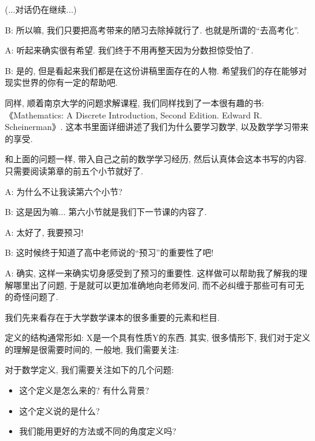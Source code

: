 


\begin{dialogue}
\begin{center}
(...对话仍在继续...)	
\end{center}
	B: 所以嘛, 我们只要把高考带来的陋习去除掉就行了. 也就是所谓的``去高考化''.
	
	A: 听起来确实很有希望. 我们终于不用再整天因为分数担惊受怕了.
	
	B: 是的, 但是看起来我们都是在这份讲稿里面存在的人物. 希望我们的存在能够对现实世界的你有一定的帮助吧. 
\end{dialogue}

同样, 顺着南京大学的问题求解课程, 我们同样找到了一本很有趣的书: 《Mathematics: A Discrete Introduction, Second Edition. Edward R. Scheinerman》. 这本书里面详细讲述了我们为什么要学习数学, 以及数学学习带来的享受. 

\begin{prob}
	和上面的问题一样, 带入自己之前的数学学习经历, 然后认真体会这本书写的内容. 只需要阅读第章的前五个小节就好了. 
\end{prob}

\begin{dialogue}
	A: 为什么不让我读第六个小节?
	
	B: 这是因为嘛... 第六小节就是我们下一节课的内容了.
	
	A: 太好了, 我要预习! 
	
	B: 这时候终于知道了高中老师说的``预习''的重要性了吧!
	
	A: 确实, 这样一来确实切身感受到了预习的重要性. 这样做可以帮助我了解我的理解哪里出了问题, 于是就可以更加准确地向老师发问, 而不必纠缠于那些可有可无的奇怪问题了. 
	
\end{dialogue}

我们先来看存在于大学数学课本的很多重要的元素和栏目. 

定义的结构通常形如: X是一个具有性质Y的东西. 其实, 很多情形下, 我们对于定义的理解是很需要时间的, 一般地, 我们需要关注:

\begin{idea}
	对于数学定义, 我们需要关注如下的几个问题: 
	\begin{itemize}
		\item 这个定义是怎么来的? 有什么背景?
		\item 这个定义说的是什么?
		\item 我们能用更好的方法或不同的角度定义吗?
	\end{itemize}
\end{idea}

